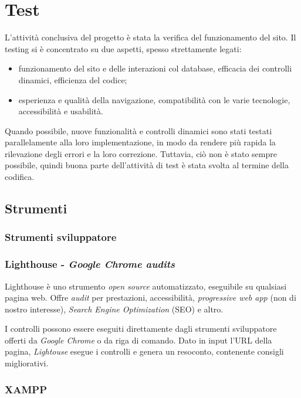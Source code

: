 \section{Test}
\label{test}
L'attività conclusiva del progetto è stata la verifica del funzionamento del sito. Il testing si è concentrato su due aspetti, spesso strettamente legati: 
\begin{itemize}
	\item funzionamento del sito e delle interazioni col database, efficacia dei controlli dinamici, efficienza del codice;
	\item esperienza e qualità della navigazione, compatibilità con le varie tecnologie, accessibilità e usabilità.
\end{itemize}
Quando possibile, nuove funzionalità e controlli dinamici sono stati testati parallelamente alla loro implementazione, in modo da rendere più rapida la rilevazione degli errori e la loro correzione. Tuttavia, ciò non è stato sempre possibile, quindi buona parte dell'attività di test è stata svolta al termine della codifica.

\subsection{Strumenti}
\label{test-strumenti}

\subsubsection{Strumenti sviluppatore}
\label{test-strumenti-sviluppatore}


\subsubsection{Lighthouse - \textit{Google Chrome audits}}
\label{test-strumenti-lighthouse}
Lighthouse è uno strumento \textit{open source} automatizzato, eseguibile su qualsiasi pagina web. Offre \textit{audit} per prestazioni, accessibilità, \textit{progressive web app} (non di nostro interesse), \textit{Search Engine Optimization} (SEO) e altro.

I controlli possono essere eseguiti direttamente dagli strumenti sviluppatore offerti da \textit{Google Chrome} o da riga di comando. Dato in input l'URL della pagina, \textit{Lightouse} esegue i controlli e genera un resoconto, contenente consigli migliorativi. 


\subsubsection{XAMPP}
\label{test-strumenti-xampp}


